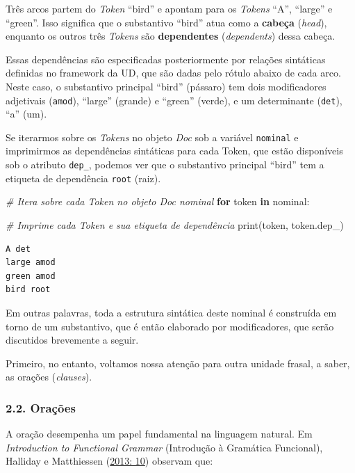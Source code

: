 \documentclass[
  brazilian,
]{article}
\newenvironment{Shaded}{}{}
\newcommand{\BuiltInTok}[1]{#1}
\newcommand{\CommentTok}[1]{\textcolor[rgb]{0.38,0.63,0.69}{\textit{#1}}}
\newcommand{\ControlFlowTok}[1]{\textcolor[rgb]{0.00,0.44,0.13}{\textbf{#1}}}
\newcommand{\KeywordTok}[1]{\textcolor[rgb]{0.00,0.44,0.13}{\textbf{#1}}}
\newcommand{\NormalTok}[1]{#1}
\begin{document}
Três arcos partem do \emph{Token} ``bird'' e apontam para os
\emph{Tokens} ``A'', ``large'' e ``green''. Isso significa que o
substantivo ``bird'' atua como a \textbf{cabeça} (\emph{head}), enquanto
os outros três \emph{Tokens} são \textbf{dependentes}
(\emph{dependents}) dessa cabeça.

Essas dependências são especificadas posteriormente por relações
sintáticas definidas no framework da UD, que são dadas pelo rótulo
abaixo de cada arco. Neste caso, o substantivo principal ``bird''
(pássaro) tem dois modificadores adjetivais (\texttt{amod}), ``large''
(grande) e ``green'' (verde), e um determinante (\texttt{det}), ``a''
(um).

Se iterarmos sobre os \emph{Tokens} no objeto \emph{Doc} sob a variável
\texttt{nominal} e imprimirmos as dependências sintáticas para cada
Token, que estão disponíveis sob o atributo \texttt{dep\_}, podemos ver
que o substantivo principal ``bird'' tem a etiqueta de dependência
\texttt{root} (raiz).

\begin{Shaded}
\begin{Highlighting}[]
\CommentTok{\# Itera sobre cada Token no objeto Doc \textquotesingle{}nominal\textquotesingle{}}
\ControlFlowTok{for}\NormalTok{ token }\KeywordTok{in}\NormalTok{ nominal:}
    
    \CommentTok{\# Imprime cada Token e sua etiqueta de dependência}
    \BuiltInTok{print}\NormalTok{(token, token.dep\_)}
\end{Highlighting}
\end{Shaded}

\begin{verbatim}
A det
large amod
green amod
bird root
\end{verbatim}

Em outras palavras, toda a estrutura sintática deste nominal é
construída em torno de um substantivo, que é então elaborado por
modificadores, que serão discutidos brevemente a seguir.

Primeiro, no entanto, voltamos nossa atenção para outra unidade frasal,
a saber, as orações (\emph{clauses}).

\hypertarget{orauxe7uxf5es}{%
\subsubsection{2.2. Orações}\label{orauxe7uxf5es}}

A oração desempenha um papel fundamental na linguagem natural. Em
\emph{Introduction to Functional Grammar} (Introdução à Gramática
Funcional), Halliday e Matthiessen
(\href{https://doi.org/10.4324/9780203431269}{2013: 10}) observam que:
\end{document}
